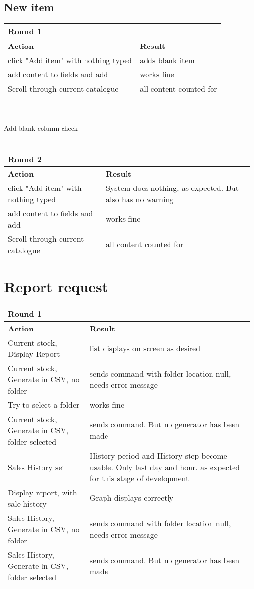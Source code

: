 \documentclass[11pt,a4paper]{article}
\begin{document}
	\subsection{New item}
	\begin{tabular}{|m{7cm}|m{7cm}|}
		\hline Round 1&\\
		\hline \textbf{Action} & \textbf{Result}\\
		\hline click "Add item" with nothing typed & \color{red}adds blank item \\
		\hline add content to fields and add & works fine\\
		\hline Scroll through current catalogue & all content counted for\\
		\hline 
	\end{tabular}\\ \ \\
	Add blank column check\\ \ \\
	\hspace*{-0.1cm}
	\begin{tabular}{|m{7cm}|m{7cm}|}
		\hline Round 2&\\
		\hline \textbf{Action} & \textbf{Result}\\
		\hline click "Add item" with nothing typed &\color{red} System does nothing, as expected. But also has no warning \\
		\hline add content to fields and add & works fine\\
		\hline Scroll through current catalogue&all content counted for\\
		\hline 
	\end{tabular}


	
	\section{Report request}
\begin{tabular}{|m{7cm}|m{7cm}|}
	\hline Round 1&\\
	\hline \textbf{Action} & \textbf{Result}\\
	\hline Current stock, Display Report & list displays on screen as desired\\
	\hline Current stock, Generate in CSV, no folder & \color{red}sends command with folder location null, needs error message\\
	\hline Try to select a folder& works fine\\
	\hline Current stock, Generate in CSV, folder selected& sends command. \color{red}But no generator has been made \\
	\hline Sales History set& History period and History step become usable. \color{brown}Only last day and hour, as expected for this stage of development\\
	\hline Display report, with sale history & Graph displays correctly\\
	\hline Sales History, Generate in CSV, no folder & \color{red}sends command with folder location null, needs error message\\
	\hline Sales History, Generate in CSV, folder selected& sends command. \color{red}But no generator has been made \\
	\hline 
\end{tabular}
\end{document}
